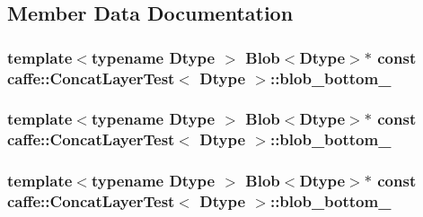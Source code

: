 \subsection{Member Data Documentation}
\hypertarget{classcaffe_1_1_concat_layer_test_a2aeb1f380b300d1adf464e5a9c7374bc}{
\subsubsection[{blob\+\_\+bottom\+\_\+0}]{\setlength{\rightskip}{0pt plus 5cm}template$<$typename Dtype $>$ {\bf Blob}$<$Dtype$>$$\ast$ const {\bf caffe\+::\+Concat\+Layer\+Test}$<$ Dtype $>$\+::blob\+\_\+bottom\+\_\hspace{0.3cm}{\ttfamily [protected]}}}\label{classcaffe_1_1_concat_layer_test_a2aeb1f380b300d1adf464e5a9c7374bc}
\hypertarget{classcaffe_1_1_concat_layer_test_a243aef5df87eadba613ca2b28c1b417b}{
\subsubsection[{blob\+\_\+bottom\+\_\+1}]{\setlength{\rightskip}{0pt plus 5cm}template$<$typename Dtype $>$ {\bf Blob}$<$Dtype$>$$\ast$ const {\bf caffe\+::\+Concat\+Layer\+Test}$<$ Dtype $>$\+::blob\+\_\+bottom\+\_\hspace{0.3cm}{\ttfamily [protected]}}}\label{classcaffe_1_1_concat_layer_test_a243aef5df87eadba613ca2b28c1b417b}
\hypertarget{classcaffe_1_1_concat_layer_test_ac1adcb4ac23846de69e5225810b74c73}{
\subsubsection[{blob\+\_\+bottom\+\_\+2}]{\setlength{\rightskip}{0pt plus 5cm}template$<$typename Dtype $>$ {\bf Blob}$<$Dtype$>$$\ast$ const {\bf caffe\+::\+Concat\+Layer\+Test}$<$ Dtype $>$\+::blob\+\_\+bottom\+\_\hspace{0.3cm}{\ttfamily [protected]}}}\label{classcaffe_1_1_concat_layer_test_ac1adcb4ac23846de69e5225810b74c73}
